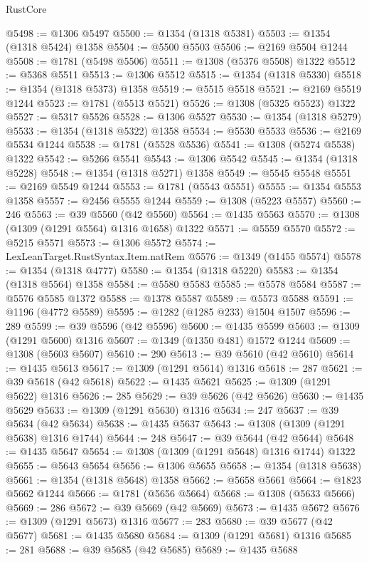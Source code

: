 \begin{lexlean}{RustCore}
\begin{coremodule}
@5498 := @1306 @5497
@5500 := @1354 (@1318 @5381)
@5503 := @1354 (@1318 @5424) @1358
@5504 := @5500 @5503
@5506 := @2169 @5504 @1244
@5508 := @1781 (@5498 @5506)
@5511 := @1308 (@5376 @5508) @1322
@5512 := @5368 @5511
@5513 := @1306 @5512
@5515 := @1354 (@1318 @5330)
@5518 := @1354 (@1318 @5373) @1358
@5519 := @5515 @5518
@5521 := @2169 @5519 @1244
@5523 := @1781 (@5513 @5521)
@5526 := @1308 (@5325 @5523) @1322
@5527 := @5317 @5526
@5528 := @1306 @5527
@5530 := @1354 (@1318 @5279)
@5533 := @1354 (@1318 @5322) @1358
@5534 := @5530 @5533
@5536 := @2169 @5534 @1244
@5538 := @1781 (@5528 @5536)
@5541 := @1308 (@5274 @5538) @1322
@5542 := @5266 @5541
@5543 := @1306 @5542
@5545 := @1354 (@1318 @5228)
@5548 := @1354 (@1318 @5271) @1358
@5549 := @5545 @5548
@5551 := @2169 @5549 @1244
@5553 := @1781 (@5543 @5551)
@5555 := @1354 @5553 @1358
@5557 := @2456 @5555 @1244
@5559 := @1308 (@5223 @5557)
@5560 := 246
@5563 := @39 @5560 (@42 @5560)
@5564 := @1435 @5563
@5570 := @1308 (@1309 (@1291 @5564) @1316 @1658) @1322
@5571 := @5559 @5570
@5572 := @5215 @5571
@5573 := @1306 @5572
@5574 := LexLeanTarget.RustSyntax.Item.natRem
@5576 := @1349 (@1455 @5574)
@5578 := @1354 (@1318 @4777)
@5580 := @1354 (@1318 @5220)
@5583 := @1354 (@1318 @5564) @1358
@5584 := @5580 @5583
@5585 := @5578 @5584
@5587 := @5576 @5585 @1372
@5588 := @1378 @5587
@5589 := @5573 @5588
@5591 := @1196 (@4772 @5589)
@5595 := @1282 (@1285 @233) @1504 @1507
@5596 := 289
@5599 := @39 @5596 (@42 @5596)
@5600 := @1435 @5599
@5603 := @1309 (@1291 @5600) @1316
@5607 := @1349 (@1350 @481) @1572 @1244
@5609 := @1308 (@5603 @5607)
@5610 := 290
@5613 := @39 @5610 (@42 @5610)
@5614 := @1435 @5613
@5617 := @1309 (@1291 @5614) @1316
@5618 := 287
@5621 := @39 @5618 (@42 @5618)
@5622 := @1435 @5621
@5625 := @1309 (@1291 @5622) @1316
@5626 := 285
@5629 := @39 @5626 (@42 @5626)
@5630 := @1435 @5629
@5633 := @1309 (@1291 @5630) @1316
@5634 := 247
@5637 := @39 @5634 (@42 @5634)
@5638 := @1435 @5637
@5643 := @1308 (@1309 (@1291 @5638) @1316 @1744)
@5644 := 248
@5647 := @39 @5644 (@42 @5644)
@5648 := @1435 @5647
@5654 := @1308 (@1309 (@1291 @5648) @1316 @1744) @1322
@5655 := @5643 @5654
@5656 := @1306 @5655
@5658 := @1354 (@1318 @5638)
@5661 := @1354 (@1318 @5648) @1358
@5662 := @5658 @5661
@5664 := @1823 @5662 @1244
@5666 := @1781 (@5656 @5664)
@5668 := @1308 (@5633 @5666)
@5669 := 286
@5672 := @39 @5669 (@42 @5669)
@5673 := @1435 @5672
@5676 := @1309 (@1291 @5673) @1316
@5677 := 283
@5680 := @39 @5677 (@42 @5677)
@5681 := @1435 @5680
@5684 := @1309 (@1291 @5681) @1316
@5685 := 281
@5688 := @39 @5685 (@42 @5685)
@5689 := @1435 @5688

\end{coremodule}
\end{lexlean}
